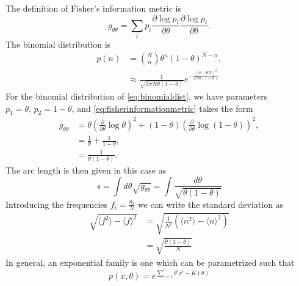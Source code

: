 
The definition of Fisher's information metric is
\begin{equation}\label{eq:fisherinformationmetric}
    g_{\theta \theta} = \sum_{i} p_i \frac{\partial \log p_i}{\partial \theta} \frac{\partial \log p_i}{\partial \theta}.
\end{equation}
The binomial distribution is
\begin{equation}\label{eq:binomialdist}
    \begin{aligned}
        p(n) &= \binom{N}{n} \theta^n (1-\theta)^{N-n},\\
        &\approx \frac{1}{\sqrt{2\pi N \theta(1-\theta)}} e^{-\frac{(n-\theta N)^2}{2 N \theta(1-\theta)}}
    \end{aligned}
\end{equation}
For the binomial distribution of \ref{eq:binomialdist}, we have parameters $p_1 = \theta,\,p_2 = 1 - \theta$, and \ref{eq:fisherinformationmetric} takes the form
\begin{equation}\label{eq:fimbinomial}
    \begin{aligned}
        g_{\theta \theta} &= \theta \left( \frac{\partial}{\partial \theta} \log \theta \right)^2 + (1 - \theta) \left( \frac{\partial}{\partial \theta} \log (1 - \theta) \right)^2,\\
                          &= \frac{1}{\theta} + \frac{1}{1 - \theta},\\
                          &= \frac{1}{\theta (1-\theta)}.
     \end{aligned}
 \end{equation}
The arc length is then given in this case as
\begin{equation}\label{eq:arclengthbinomial}
    s = \int d \theta \sqrt{g_{\theta \theta}} = \int \frac{d\theta}{\sqrt{\theta(1-\theta)}}
\end{equation}
Introducing the frequencies $f_i = \frac{n_i}{N}$ we can write the standard deviation as
\begin{equation}
    \begin{aligned}
        \sqrt{\langle f^2 \rangle - \langle f \rangle^2} &= \sqrt{\frac{1}{N^2} \left(\langle n^2 \rangle - \langle n \rangle^2 \right)}\\
        &= \sqrt{\frac{\theta(1-\theta)}{N}}
    \end{aligned}
\end{equation}
In general, an exponential family is one which can be parametrized such that
\begin{equation}\label{eq:expfamily}
    p(x,\theta) = e^{\sum_{i=1}^{r} \theta^i x^i - K(\theta)}
\end{equation}

